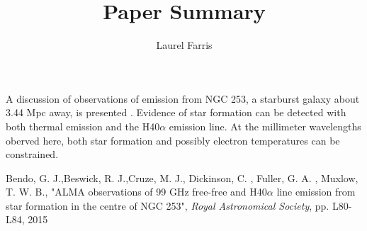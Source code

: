 \documentclass{article}
\begin{document}
\title{Paper Summary}
\author{Laurel Farris}

\maketitle
A discussion of observations of emission from NGC 253, a starburst galaxy
about 3.44 Mpc away, is presented \cite{alma}. Evidence of star formation 
can be detected with both thermal emission and the H40$\alpha$ emission line.
At the millimeter wavelengths oberved here, both star formation and possibly 
electron temperatures can be constrained.


%
%

\begin{thebibliography}{1}
 Bendo, G. J.,Beswick, R. J.,Cruze, M. J.,
                Dickinson, C. , Fuller, G. A. , Muxlow, T. W. B.,
	"ALMA observations of 99 GHz free-free and H40$\alpha$ line
		emission from star formation in the centre of NGC 253",
	\emph{Royal Astronomical Society}, pp. L80-L84, 2015
\end{thebibliography}
\end{document}
